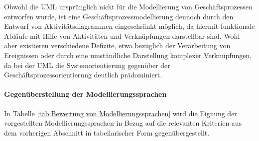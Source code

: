 Obwohl die \ac{UML} ursprünglich nicht für die Modellierung von Geschäftsprozessen entworfen wurde, ist eine Geschäftsprozessmodellierung dennoch durch den Entwurf von Aktivitätsdiagrammen eingeschränkt möglich, da hiermit funktionale Abläufe mit Hilfe von Aktivitäten und Verknüpfungen darstellbar sind. 
\cite{vanRanden.2016}
Wohl aber existieren verschiedene Defizite, etwa bezüglich der Verarbeitung von Ereignissen oder durch eine umständliche Darstellung komplexer Verknüpfungen, da bei der \ac{UML} die Systemorientierung gegenüber der Geschäftsprozessorientierung deutlich prädominiert.
\cite{Staud.2006}

\paragraph{Gegenüberstellung der Modellierungssprachen}
In Tabelle \ref{tab:Bewertung von Modellierungssprachen} wird die Eignung der vorgestellten Modellierungssprachen in Bezug auf die relevanten Kriterien aus dem vorherigen Abschnitt in tabellarischer Form gegenübergestellt.

